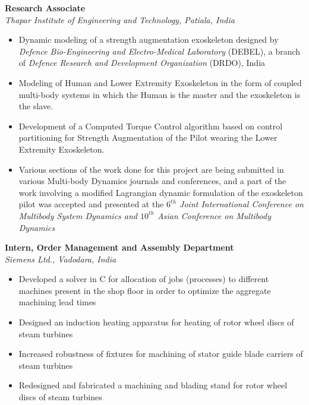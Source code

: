 \vspace{0.1 in}

\large{\textbf{Research Associate}}
\hfill
\drdodate\\
\emph{\large{Thapar Institute of Engineering and Technology, Patiala, India}}
\begin{itemize}
\item \large{Dynamic modeling of a strength augmentation exoskeleton designed by \emph{Defence Bio-Engineering and Electro-Medical Laboratory} (DEBEL), a branch of \emph{Defence Research and Development Organization} (DRDO), India}
\item\large{Modeling of Human and Lower Extremity Exoskeleton in the form of coupled multi-body systems in which the Human is the master and the exoskeleton is the slave.}
\item\large{Development of a Computed Torque Control algorithm based on control partitioning for Strength Augmentation of the Pilot wearing the Lower Extremity Exoskeleton.}
\item\large{Various sections of the work done for this project are being submitted in various Multi-body Dynamics journals and conferences, and a part of the work involving a modified Lagrangian dynamic formulation of the exoskeleton pilot was accepted and presented at the \emph{$6^{th}$ Joint International Conference on Multibody System Dynamics and $10^{th}$ Asian Conference on Multibody Dynamics}}
\end{itemize}

\vspace{0.1 in}

\large{\textbf{Intern, Order Management and Assembly Department}}
\hfill
\siemensdate\\
\large{\emph{Siemens Ltd., Vadodara, India}}
\begin{itemize}
\item\large{Developed a solver in C for allocation of jobs (processes) to different machines present in the shop floor in order to optimize the aggregate machining lead times}
\item\large{Designed an induction heating apparatus for heating of rotor wheel discs of steam turbines}
\item\large{Increased robustness of fixtures for machining of stator guide blade carriers of steam turbines}
\item\large{Redesigned and fabricated a machining and blading stand for rotor wheel discs of steam turbines }
\end{itemize}

